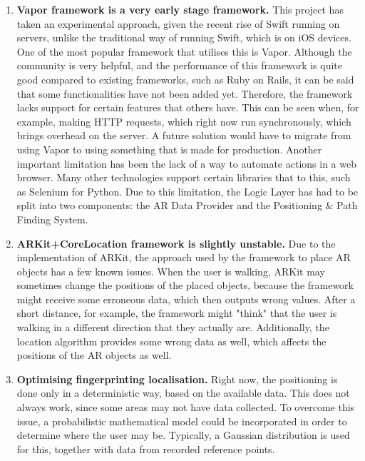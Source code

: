 \begin{enumerate}
    \item \textbf{Vapor framework is a very early stage framework.}\newline
    This project has taken an experimental approach, given the recent rise of Swift running on servers, unlike the traditional way of running Swift, which is on iOS devices. One of the most popular framework that utilises this is Vapor. Although the community is very helpful, and the performance of this framework is quite good compared to existing frameworks, such as Ruby on Rails, it can be said that some functionalities have not been added yet. Therefore, the framework lacks support for certain features that others have. This can be seen when, for example, making HTTP requests, which right now run synchronously, which brings overhead on the server. A future solution would have to migrate from using Vapor to using something that is made for production. Another important limitation has been the lack of a way to automate actions in a web browser. Many other technologies support certain libraries that to this, such as Selenium for Python. Due to this limitation, the Logic Layer has had to be split into two components: the AR Data Provider and the Positioning \& Path Finding System.
    
    \item \textbf{ARKit+CoreLocation framework is slightly unstable.}\newline
    Due to the implementation of ARKit, the approach used by the framework to place AR objects has a few known issues. When the user is walking, ARKit may sometimes change the positions of the placed objects, because the framework might receive some erroneous data, which then outputs wrong values. After a short distance, for example, the framework might "think" that the user is walking in a different direction that they actually are. Additionally, the location algorithm provides some wrong data as well, which affects the positions of the AR objects as well.
    
    \item \textbf{Optimising fingerprinting localisation.}\newline
    Right now, the positioning is done only in a deterministic way, based on the available data. This does not always work, since some areas may not have data collected. To overcome this issue, a probabilistic mathematical model could be incorporated in order to determine where the user may be. Typically, a Gaussian distribution is used for this, together with data from recorded reference points. 
    

\end{enumerate}
